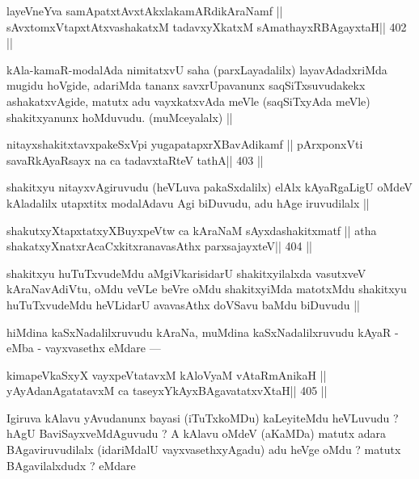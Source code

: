 \begin{shl}
layeVneYva samApatxtAvxtAkxlakamARdikAraNamf ||
sAvxtomxVtapxtAtxvashakatxM tadavxyXkatxM sAmathayxRBAgayxtaH\hfill || 402 ||
\end{shl}

\begin{artha}
kAla-kamaR-modalAda nimitatxvU saha (parxLayadalilx) layavAdadxriMda mugidu hoVgide, adariMda tananx savxrUpavanunx saqSiTxsuvudakekx ashakatxvAgide, matutx adu vayxkatxvAda meVle (saqSiTxyAda meVle) shakitxyanunx hoMduvudu. (muMceyalalx) ||
\end{artha}

\begin{shl}
nitayxshakitxtavxpakeSxV\s pi yugapatapxrXBavAdikamf ||
pArxponxVti savaRkAyaRsayx na ca tadavxtaRteV tathA\hfill || 403 ||
\end{shl}

\begin{artha}
shakitxyu nitayxvAgiruvudu (heVLuva pakaSxdalilx) elAlx kAyaRgaLigU oMdeV kAladalilx utapxtitx modalAdavu Agi biDuvudu, adu hAge iruvudilalx ||
\end{artha}

\begin{shl}
shakutxyXtapxtatxyXBuyxpeVtw ca kAraNaM sAyxdashakitxmatf ||
atha shakatxyXnatxrAcaCxkitxranavasAthx parxsajayxteV\hfill || 404 ||
\end{shl}

\begin{artha}
shakitxyu huTuTxvudeMdu aMgiVkarisidarU shakitxyilalxda vasutxveV kAraNavAdiVtu, oMdu veVLe beVre oMdu shakitxyiMda matotxMdu shakitxyu huTuTxvudeMdu heVLidarU avavasAthx doVSavu baMdu biDuvudu || 
\end{artha}

\begin{artha}
hiMdina kaSxNadalilxruvudu kAraNa, muMdina kaSxNadalilxruvudu kAyaR - eMba - vayxvasethx eMdare ---
\end{artha}

\begin{shl}
kimapeVkaSxyX vayxpeVtatavxM kAloV\s yaM vAtaRmAnikaH ||
yAyAdanAgatatavxM ca taseyxYkAyxBAgavatatxvXtaH\hfill || 405 ||
\end{shl}

\begin{artha}
Igiruva kAlavu yAvudanunx bayasi (iTuTxkoMDu) kaLeyiteMdu heVLuvudu ? hAgU BaviSayxveMdAguvudu ? A kAlavu oMdeV (aKaMDa) matutx adara BAgaviruvudilalx (idariMdalU vayxvasethxyAgadu) adu heVge oMdu ? matutx BAgavilalxdudx ? eMdare
\end{artha}


